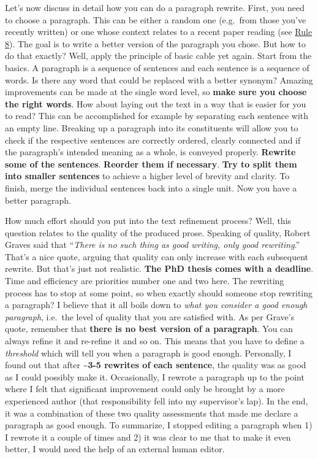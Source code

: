 \documentclass[
  12pt,
  oneside]{book}
\begin{document}
Let's now discuss in detail how you can do a paragraph rewrite.
First, you need to choose a paragraph.
This can be either a random one (e.g.~from those you've recently written) or one whose context relates to a recent paper reading (see \protect\hyperlink{rule8}{Rule 8}).
The goal is to write a better version of the paragraph you chose.
But how to do that exactly?
Well, apply the principle of basic cable yet again.
Start from the basics.
A paragraph is a sequence of sentences and each sentence is a sequence of words.
Is there any word that could be replaced with a better synonym?
Amazing improvements can be made at the single word level, so \textbf{make sure you choose the right words}.
How about laying out the text in a way that is easier for you to read?
This can be accomplished for example by separating each sentence with an empty line.
Breaking up a paragraph into its constituents will allow you to check if the respective sentences are correctly ordered, clearly connected and if the paragraph's intended meaning as a whole, is conveyed properly.
\textbf{Rewrite some of the sentences}.
\textbf{Reorder them if necessary}.
\textbf{Try to split them into smaller sentences} to achieve a higher level of brevity and clarity.
To finish, merge the individual sentences back into a single unit.
Now you have a better paragraph.

How much effort should you put into the text refinement process?
Well, this question relates to the quality of the produced prose.
Speaking of quality, Robert Graves said that ``\emph{There is no such thing as good writing, only good rewriting}.''
That's a nice quote, arguing that quality can only increase with each subsequent rewrite.
But that's just not realistic.
\textbf{The PhD thesis comes with a deadline}.
Time and efficiency are priorities number one and two here.
The rewriting process has to stop at some point, so when exactly should someone stop rewriting a paragraph?
I believe that it all boils down to \emph{what you consider a good enough paragraph}, i.e.~the level of quality that you are satisfied with.
As per Grave's quote, remember that \textbf{there is no best version of a paragraph}.
You can always refine it and re-refine it and so on.
This means that you have to define a \emph{threshold} which will tell you when a paragraph is good enough.
Personally, I found out that after \textbf{\textasciitilde3-5 rewrites of each sentence}, the quality was as good as I could possibly make it.
Occasionally, I rewrote a paragraph up to the point where I felt that significant improvement could only be brought by a more experienced author (that responsibility fell into my supervisor's lap).
In the end, it was a combination of these two quality assessments that made me declare a paragraph as good enough.
To summarize, I stopped editing a paragraph when 1) I rewrote it a couple of times and 2) it was clear to me that to make it even better, I would need the help of an external human editor.
\end{document}
